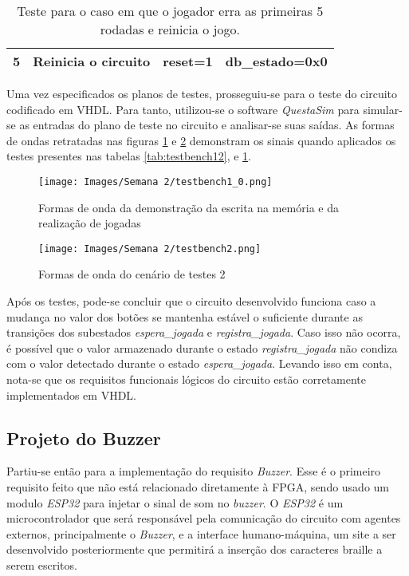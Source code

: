 \documentclass[amsmath,amssymb,floatfix]{report}
\begin{document}
\begin{table}[H]
\begin{tabular}{|cccc|}
\multicolumn{1}{|c|}{5}          & \multicolumn{1}{c|}{Reinicia o circuito} & \multicolumn{1}{c|}{reset=1}                                                            & \multicolumn{1}{c|}{db\_estado=0x0}              \\ \hline
\end{tabular}
\caption{Teste para o caso em que o jogador erra as primeiras 5 rodadas e reinicia o jogo.}
\label{tab:testbench22}
\end{table}

Uma vez especificados os planos de testes, prosseguiu-se para o teste do circuito codificado em VHDL. Para tanto, utilizou-se o software \textit{QuestaSim} para simular-se as entradas do plano de teste no circuito e analisar-se suas saídas. As formas de ondas retratadas nas figuras \ref{fig:testbench12} e \ref{fig:testbench22} demonstram os sinais quando aplicados os testes presentes nas tabelas \ref{tab:testbench12}, e \ref{tab:testbench22}. 

\begin{figure}[H]
    \centering
    \texttt{[image: Images/Semana 2/testbench1\_0.png]}
    \caption{Formas de onda da demonstração da escrita na memória e da realização de jogadas}
    \label{fig:testbench12}
\end{figure}

\begin{figure}[H]
    \centering
    \texttt{[image: Images/Semana 2/testbench2.png]}
    \caption{Formas de onda do cenário de testes 2}
    \label{fig:testbench22}
\end{figure}


Após os testes, pode-se concluir que o circuito desenvolvido funciona caso a mudança no valor dos botões se mantenha estável o suficiente durante as transições dos subestados \textit{espera\_jogada} e \textit{registra\_jogada}. Caso isso não ocorra, é possível que o valor armazenado durante o estado \textit{registra\_jogada} não condiza com o valor detectado durante o estado \textit{espera\_jogada}. Levando isso em conta, nota-se que os requisitos funcionais lógicos do circuito estão corretamente implementados em VHDL.

\subsection{Projeto do Buzzer}
\label{subsec:projetoBuzzer2}
Partiu-se então para a implementação do requisito \textit{Buzzer}. Esse é o primeiro requisito feito que não está relacionado diretamente à FPGA, sendo usado um modulo \textit{ESP32} para injetar o sinal de som no \textit{buzzer}. O \textit{ESP32} é um microcontrolador que será responsável pela comunicação do circuito com agentes externos, principalmente o \textit{Buzzer}, e a interface humano-máquina, um site a ser desenvolvido posteriormente que permitirá a inserção dos caracteres braille a serem escritos.
\end{document}
